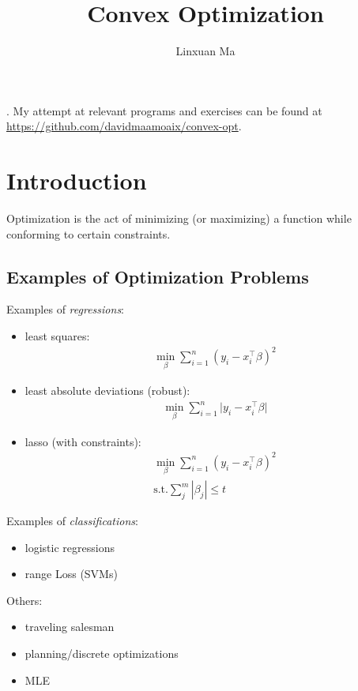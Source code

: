 \documentclass[12pt]{article}
\title{Convex Optimization}
\author{Linxuan Ma}
\newcommand{\mo}[1]{\lvert #1 \rvert}
\theoremstyle{definition}
\begin{document}
	\maketitle
	
	. My attempt at relevant programs and exercises can be found at \url{https://github.com/davidmaamoaix/convex-opt}.
	
	\section{Introduction}
	
	Optimization is the act of minimizing (or maximizing) a function while conforming to certain constraints.
	
	\subsection{Examples of Optimization Problems}
	
	Examples of \emph{regressions}:
	\begin{itemize}
		\item least squares: \begin{gather*}
			\min_\beta \sum_{i=1}^n(y_i - x_i^\top \beta)^2
		\end{gather*}
		\item least absolute deviations (robust): \begin{gather*}
			\min_\beta \sum_{i=1}^n \mo{y_i - x_i^\top \beta}
		\end{gather*}
		\item lasso (with constraints): \begin{gather*}
			\min_\beta \sum_{i=1}^n(y_i - x_i^\top \beta)^2 \\\text{s.t.} \sum_j^m |\beta_j| \le t
		\end{gather*}
		\end{itemize}
		
	Examples of \emph{classifications}:
	\begin{itemize}
		\item logistic regressions
		\item range Loss (SVMs)
	\end{itemize}
	
	Others:
	\begin{itemize}
		\item traveling salesman
		\item planning/discrete optimizations
		\item MLE
	\end{itemize}
	
\end{document}
